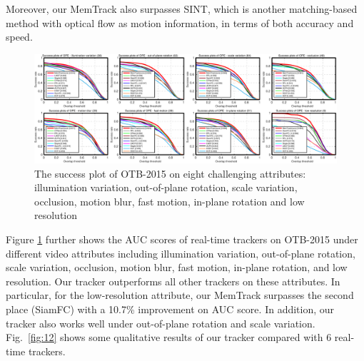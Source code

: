 \documentclass[runningheads]{llncs}
\newcommand{\yty}[1]{\textcolor{black}{#1}}
\begin{document}
Moreover, our MemTrack also surpasses SINT, which is another matching-based method with optical flow as motion information, in terms of both accuracy and speed.
\begin{figure}[t]
	\begin{center}
		\includegraphics[width=\linewidth]{realtime-attri-tb100.pdf}
	\end{center}
	\vspace{-5mm}
	\caption{The success plot of OTB-2015 on eight challenging attributes: illumination variation, out-of-plane rotation, scale variation, occlusion, motion blur, fast motion, in-plane rotation and low resolution }
	\label{fig:11}
\end{figure}
Figure \ref{fig:11} further shows the AUC scores of real-time trackers on OTB-2015 under different video attributes including illumination variation, out-of-plane rotation, scale variation, occlusion, motion blur, fast motion, in-plane rotation, and low resolution. Our tracker outperforms all other trackers on these attributes. In particular, for the low-resolution attribute, our MemTrack surpasses the second place (SiamFC) with a 10.7\% improvement on AUC score. %
In addition, our tracker also works well under out-of-plane rotation and scale variation.
Fig.~\ref{fig:12} shows some qualitative results of our tracker compared with 6 real-time trackers. 

\end{document}
